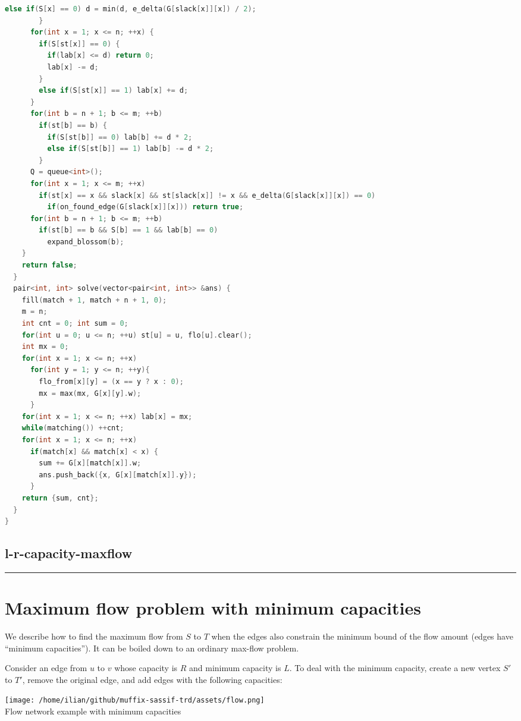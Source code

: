 \documentclass[9pt,a4paper,landscape,twosided]{extarticle}
\begin{document}
\begin{multicols*}{3}
\begin{lstlisting}[language=C++]
          else if(S[x] == 0) d = min(d, e_delta(G[slack[x]][x]) / 2);
        }
      for(int x = 1; x <= n; ++x) {
        if(S[st[x]] == 0) {
          if(lab[x] <= d) return 0;
          lab[x] -= d;
        }
        else if(S[st[x]] == 1) lab[x] += d;
      }
      for(int b = n + 1; b <= m; ++b)
        if(st[b] == b) {
          if(S[st[b]] == 0) lab[b] += d * 2;
          else if(S[st[b]] == 1) lab[b] -= d * 2;
        }
      Q = queue<int>();
      for(int x = 1; x <= m; ++x)
        if(st[x] == x && slack[x] && st[slack[x]] != x && e_delta(G[slack[x]][x]) == 0)
          if(on_found_edge(G[slack[x]][x])) return true;
      for(int b = n + 1; b <= m; ++b)
        if(st[b] == b && S[b] == 1 && lab[b] == 0)
          expand_blossom(b);
    }
    return false;
  }
  pair<int, int> solve(vector<pair<int, int>> &ans) {
    fill(match + 1, match + n + 1, 0);
    m = n;
    int cnt = 0; int sum = 0;
    for(int u = 0; u <= n; ++u) st[u] = u, flo[u].clear();
    int mx = 0;
    for(int x = 1; x <= n; ++x)
      for(int y = 1; y <= n; ++y){
        flo_from[x][y] = (x == y ? x : 0);
        mx = max(mx, G[x][y].w);
      }
    for(int x = 1; x <= n; ++x) lab[x] = mx;
    while(matching()) ++cnt;
    for(int x = 1; x <= n; ++x)
      if(match[x] && match[x] < x) {
        sum += G[x][match[x]].w;
        ans.push_back({x, G[x][match[x]].y});
      }
    return {sum, cnt};
  }
}
\end{lstlisting}

\subsection{l-r-capacity-maxflow}
\noindent\rule{\linewidth}{0.15mm}
\section*{Maximum flow problem with minimum capacities}

We describe how to find the maximum flow from $S$ to $T$ when the edges also constrain the minimum bound of the flow amount (edges have ``minimum capacities''). It can be boiled down to an ordinary max-flow problem.

Consider an edge from $u$ to $v$ whose capacity is $R$ and minimum capacity is $L$. To deal with the minimum capacity, create a new vertex $S'$ to $T'$, remove the original edge, and add edges with the following capacities:

\begin{center}
    \texttt{[image: /home/ilian/github/muffix-sassif-trd/assets/flow.png]} \\
    Flow network example with minimum capacities
\end{center}


\end{multicols*}
\end{document}
